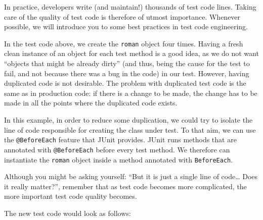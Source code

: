 In practice, developers write (and maintain!) thousands of test code
lines. Taking care of the quality of test code is therefore of utmost
importance. Whenever possible, we will introduce you to some best
practices in test code engineering.

In the test code above, we create the \texttt{roman} object four times.
Having a fresh clean instance of an object for each test method is a
good idea, as we do not want ``objects that might be already dirty''
(and thus, being the cause for the test to fail, and not because there
was a bug in the code) in our test. However, having duplicated code is
not desirable. The problem with duplicated test code is the same as in
production code: if there is a change to be made, the change has to be
made in all the points where the duplicated code exists.

In this example, in order to reduce some duplication, we could try to
isolate the line of code responsible for creating the class under test.
To that aim, we can use the \texttt{@BeforeEach} feature that JUnit
provides. JUnit runs methods that are annotated with
\texttt{@BeforeEach} before every test method. We therefore can
instantiate the \texttt{roman} object inside a method annotated with
\texttt{BeforeEach}.

Although you might be asking yourself: ``But it is just a single line of
code\ldots{} Does it really matter?'', remember that as test code
becomes more complicated, the more important test code quality becomes.

The new test code would look as follows:

